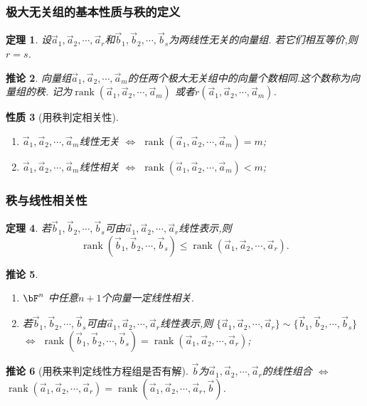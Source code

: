 \documentclass{article}
\DeclareMathOperator{\rank}{rank}
\newtheorem{theorem}{定理}  %
\newtheorem{proposition}[theorem]{性质}  %
\newtheorem{corollary}[theorem]{推论}
\renewcommand{\blue }[1]{{\textcolor[rgb]{0,0,1}{#1}}}
\begin{document}
\subsubsection{极大无关组的基本性质与秩的定义}
\begin{theorem}
设$\vec{a}_1,\vec{a}_2,\cdots,\vec{a}_r$和$\vec{b}_1,\vec{b}_2,\cdots,\vec{b}_s$为两线性无关的向量组. 若它们相互等价,则$r=s$.
\end{theorem}
\begin{corollary}
向量组$\vec{a}_1,\vec{a}_2,\cdots,\vec{a}_m$的任两个极大无关组中的向量个数相同.这个数称为\blue{向量组的秩}.
记为\blue{$\rank(\vec{a}_1,\vec{a}_2,\cdots,\vec{a}_m)$}
或者\blue{$r(\vec{a}_1,\vec{a}_2,\cdots,\vec{a}_m)$}.
\end{corollary}
\begin{proposition}[用秩判定相关性]
\begin{enumerate}
\item $\vec{a}_1,\vec{a}_2,\cdots,\vec{a}_m$线性无关 $\Leftrightarrow$ $\rank(\vec{a}_1,\vec{a}_2,\cdots,\vec{a}_m)=m$;
\item $\vec{a}_1,\vec{a}_2,\cdots,\vec{a}_m$线性相关 $\Leftrightarrow$ $\rank(\vec{a}_1,\vec{a}_2,\cdots,\vec{a}_m)<m$;
\end{enumerate}
\end{proposition}

\subsubsection{秩与线性相关性}
\begin{theorem} 若$\vec{b}_1,\vec{b}_2,\cdots,\vec{b}_s$可由$\vec{a}_1,\vec{a}_2,\cdots,\vec{a}_r$线性表示,则
\[\rank(\vec{b}_1,\vec{b}_2,\cdots,\vec{b}_s)\leq
\rank(\vec{a}_1,\vec{a}_2,\cdots,\vec{a}_r).\]
\end{theorem}
\begin{corollary}
\begin{enumerate}
\item $\bF^n$ 中任意$n+1$个向量一定线性相关.
\item 若$\vec{b}_1,\vec{b}_2,\cdots,\vec{b}_s$可由$\vec{a}_1,\vec{a}_2,\cdots,\vec{a}_r$线性表示,则 $\{\vec{a}_1,\vec{a}_2,\cdots,\vec{a}_r\}\sim\{\vec{b}_1,\vec{b}_2,\cdots,\vec{b}_s\}$ $\Leftrightarrow$ $\rank(\vec{b}_1,\vec{b}_2,\cdots,\vec{b}_s) = \rank(\vec{a}_1,\vec{a}_2,\cdots,\vec{a}_r)$;
\end{enumerate}
\end{corollary}
\begin{corollary}[用秩来判定线性方程组是否有解]
$\vec{b}$为$\vec{a}_1,\vec{a}_2,\cdots,\vec{a}_r$的线性组合 $\Leftrightarrow$ $\rank(\vec{a}_1,\vec{a}_2,\cdots,\vec{a}_r)=\rank(\vec{a}_1,\vec{a}_2,\cdots,\vec{a}_r,\vec{b})$.
\end{corollary}
\end{document}
